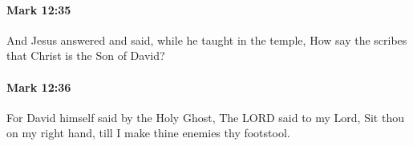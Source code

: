 		\paragraph{Mark 12:35} %
			\label{MARK-12-35}

			And Jesus answered and said, while he taught in the temple, How say the scribes that Christ is the Son of David?

			\begin{framed}
			\scriptsize
				\begin{compactdesc}
					\item[SBLG] 
				\end{compactdesc}
			\end{framed}

		\paragraph{Mark 12:36} %
			\label{MARK-12-36}

			For David himself said by the Holy Ghost, The LORD said to my Lord, Sit thou on my right hand, till I make thine enemies thy footstool.

